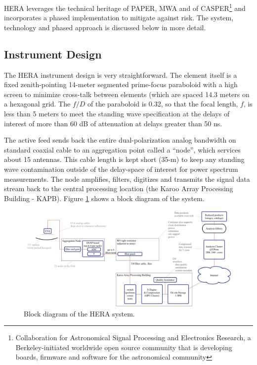 \documentclass[preprint]{aastex}
\begin{document}
HERA leverages the technical heritage of PAPER, MWA and of CASPER\footnote{Collaboration for Astronomical
Signal Processing and Electronics Research, a Berkeley-initiated worldwide open source community that is
developing boards, firmware and software for the astronomical community} and incorporates a
phased implementation to mitigate against risk.  The system, technology and phased approach is discussed below
in more detail.

\vspace{-0.25in}
\subsection{Instrument Design}
\vspace{-6pt}
\label{InstDes}
The HERA instrument design is very straightforward.  The element
itself is a fixed zenith-pointing 14-meter segmented prime-focus paraboloid with a high screen
to minimize cross-talk between elements (which are spaced 14.3 meters on a
hexagonal grid.   The $f/D$ of
the paraboloid is 0.32, so that the focal length, $f$, is less than 5 meters to meet the 
standing wave specification at the delays of interest of more than 60 dB of attenuation at delays 
greater than 50 ns.


The active feed sends back the entire dual-polarization analog bandwidth on standard
coaxial cable to an aggregation point called a ``node'', which services 
about 15 antennas.  This cable length is kept short (35-m) to keep any standing
wave contamination outside of the delay-space of interest for power spectrum
measurements.  The node amplifies, filters, digitizes and transmits the signal data stream
back to the central processing location (the Karoo Array Processing Building - KAPB).
Figure \ref{fig:blockDiagram} shows a block diagram of the system.

\begin{figure}[h]
\centering
\includegraphics[width=\textwidth]{plots/Engineering/HERA_high_level_block_diagram.jpg}
\caption{Block diagram of the HERA system.}
\label{fig:blockDiagram} 
\end{figure}
\end{document}
